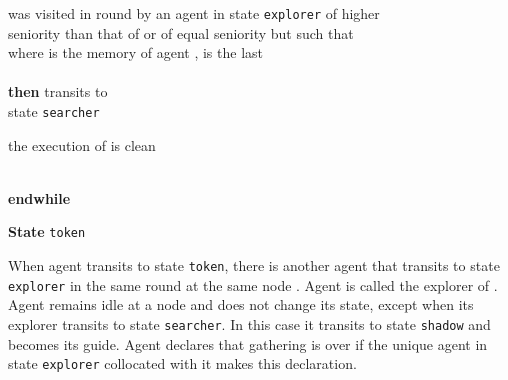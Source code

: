 \documentclass[11pt]{article}
\begin{document}
    \vspace*{0.2cm}
     \noindent
     \hspace*{1cm}{\bf if}  was visited in round  by an agent  in state {\tt explorer} of higher\\ 
      \noindent 
    \hspace*{1cm}seniority than that of 
     or of equal seniority but such that\\
      \noindent 
      \hspace*{1cm}{} where  is the memory of agent ,  is the last \\
       \noindent 
      \hspace*{1cm}{
round before  when agent  updated its variable - and }\\ 
\noindent 
      \hspace*{1cm}{is the variable - of agent  in round } {\bf then}  transits to \\
\noindent 
      \hspace*{1cm}state {\tt searcher}
    
     \vspace*{0.2cm}
     \noindent
       \hspace*{0.5cm}{\bf until} the execution of  is clean\\

     \noindent
       \hspace*{0.5cm}{agent  waits  rounds: this waiting period is interrupted} \\
       \hspace*{0.5cm}{if  is visited by another agent;} 
       
        \vspace*{0.2cm}
        \noindent
\vspace*{0.2cm}
 {{\bf endwhile}}     
 


 
 
 
 
  \vspace*{0.2cm}
 
  \noindent
{\bf State} {\tt token}
 
  When agent  transits to state {\tt token}, there is another agent  that transits to state  {\tt explorer} in the same round at the same node .
 Agent  is called the explorer of . 
Agent  remains  idle at a node  and does not change its state, except when its explorer  transits to state {\tt searcher}. In this case it transits
 to state {\tt shadow} and  becomes its guide. 
    Agent  declares that gathering is over if the unique agent in state {\tt explorer} collocated with it makes this declaration.
    
\end{document}
